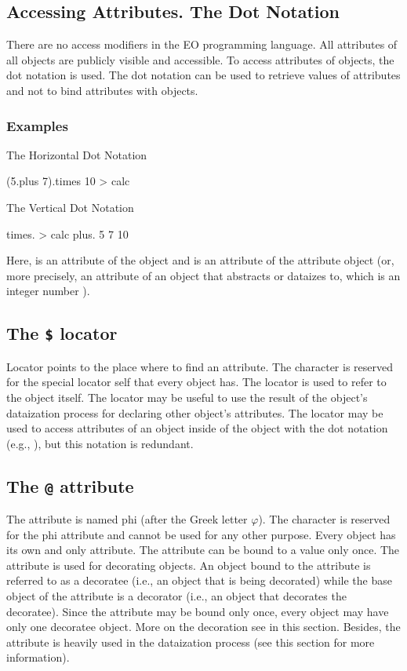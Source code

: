 \documentclass[12pt]{book}
\begin{document}
\subsection{Accessing Attributes. The Dot Notation}
There are no access modifiers in the EO programming language. All attributes of all objects are publicly visible and accessible. To access attributes of objects, the dot notation is used. The dot notation can be used to retrieve values of attributes and not to bind attributes with objects.

\subsubsection{Examples}

The Horizontal Dot Notation
\begin{ffcode}
(5.plus 7).times 10 > calc
\end{ffcode}
The Vertical Dot Notation
\begin{ffcode}
times. > calc
  plus.
    5
    7
  10
\end{ffcode}

Here,  is an attribute of the object  and  is an attribute of the attribute object  (or, more precisely, an attribute of an object that  abstracts or dataizes to, which is an integer number ).

\subsection{The \texttt{\$} locator}
Locator points to the place where to find an attribute. The \ff{$} character is reserved for the special locator self that every object has. The \ff{$} locator is used to refer to the object itself.
The \ff{$} locator may be useful to use the result of the object's dataization process for declaring other object's attributes.
The \ff{$} locator may be used to access attributes of an object inside of the object with the dot notation (e.g., ), but this notation is redundant.

\subsection{The \texttt{@} attribute} \label{subsec:pgi-attr}
The  attribute is named phi (after the Greek letter $\varphi$). The  character is reserved for the phi attribute and cannot be used for any other purpose. Every object has its own and only  attribute. The  attribute can be bound to a value only once.
The  attribute is used for decorating objects. An object bound to the  attribute is referred to as a decoratee (i.e., an object that is being decorated) while the base object of the  attribute is a decorator (i.e., an object that decorates the decoratee). Since the  attribute may be bound only once, every object may have only one decoratee object. More on the decoration see in this section.
Besides, the  attribute is heavily used in the dataization process (see this section for more information).
\end{document}
